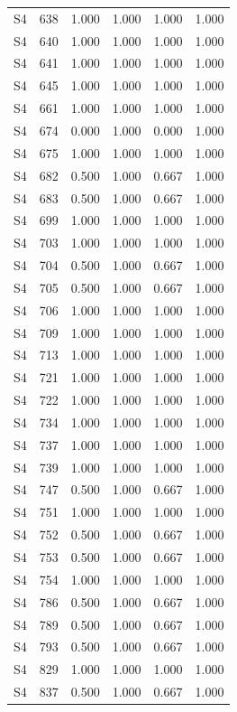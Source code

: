 \begin{tabular}{lrrrrr}
S4 & 638 & 1.000 & 1.000 & 1.000 & 1.000 \\
S4 & 640 & 1.000 & 1.000 & 1.000 & 1.000 \\
S4 & 641 & 1.000 & 1.000 & 1.000 & 1.000 \\
S4 & 645 & 1.000 & 1.000 & 1.000 & 1.000 \\
S4 & 661 & 1.000 & 1.000 & 1.000 & 1.000 \\
S4 & 674 & 0.000 & 1.000 & 0.000 & 1.000 \\
S4 & 675 & 1.000 & 1.000 & 1.000 & 1.000 \\
S4 & 682 & 0.500 & 1.000 & 0.667 & 1.000 \\
S4 & 683 & 0.500 & 1.000 & 0.667 & 1.000 \\
S4 & 699 & 1.000 & 1.000 & 1.000 & 1.000 \\
S4 & 703 & 1.000 & 1.000 & 1.000 & 1.000 \\
S4 & 704 & 0.500 & 1.000 & 0.667 & 1.000 \\
S4 & 705 & 0.500 & 1.000 & 0.667 & 1.000 \\
S4 & 706 & 1.000 & 1.000 & 1.000 & 1.000 \\
S4 & 709 & 1.000 & 1.000 & 1.000 & 1.000 \\
S4 & 713 & 1.000 & 1.000 & 1.000 & 1.000 \\
S4 & 721 & 1.000 & 1.000 & 1.000 & 1.000 \\
S4 & 722 & 1.000 & 1.000 & 1.000 & 1.000 \\
S4 & 734 & 1.000 & 1.000 & 1.000 & 1.000 \\
S4 & 737 & 1.000 & 1.000 & 1.000 & 1.000 \\
S4 & 739 & 1.000 & 1.000 & 1.000 & 1.000 \\
S4 & 747 & 0.500 & 1.000 & 0.667 & 1.000 \\
S4 & 751 & 1.000 & 1.000 & 1.000 & 1.000 \\
S4 & 752 & 0.500 & 1.000 & 0.667 & 1.000 \\
S4 & 753 & 0.500 & 1.000 & 0.667 & 1.000 \\
S4 & 754 & 1.000 & 1.000 & 1.000 & 1.000 \\
S4 & 786 & 0.500 & 1.000 & 0.667 & 1.000 \\
S4 & 789 & 0.500 & 1.000 & 0.667 & 1.000 \\
S4 & 793 & 0.500 & 1.000 & 0.667 & 1.000 \\
S4 & 829 & 1.000 & 1.000 & 1.000 & 1.000 \\
S4 & 837 & 0.500 & 1.000 & 0.667 & 1.000 \\

\end{tabular}
